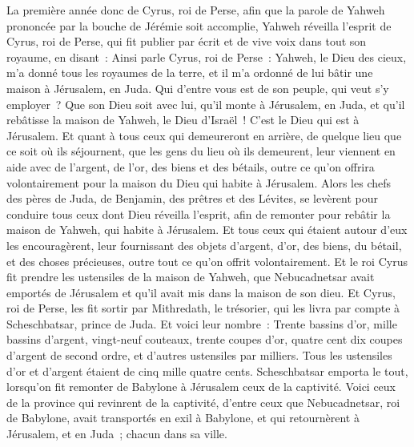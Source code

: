 \begin{multicols}{2}
\VerseOne{}La première année donc de Cyrus, roi de Perse, afin que la parole de Yahweh prononcée par la bouche de Jérémie soit accomplie, Yahweh réveilla l'esprit de Cyrus, roi de Perse, qui fit publier par écrit et de vive voix dans tout son royaume, en disant~:
Ainsi parle Cyrus, roi de Perse~: Yahweh, le Dieu des cieux, m'a donné tous les royaumes de la terre, et il m'a ordonné de lui bâtir une maison à Jérusalem, en Juda.
Qui d'entre vous est de son peuple, qui veut s'y employer~? Que son Dieu soit avec lui, qu'il monte à Jérusalem, en Juda, et qu'il rebâtisse la maison de Yahweh, le Dieu d'Israël~! C'est le Dieu qui est à Jérusalem.
Et quant à tous ceux qui demeureront en arrière, de quelque lieu que ce soit où ils séjournent, que les gens du lieu où ils demeurent, leur viennent en aide avec de l'argent, de l'or, des biens et des bétails, outre ce qu'on offrira volontairement pour la maison du Dieu qui habite à Jérusalem.
Alors les chefs des pères de Juda, de Benjamin, des prêtres et des Lévites, se levèrent pour conduire tous ceux dont Dieu réveilla l'esprit, afin de remonter pour rebâtir la maison de Yahweh, qui habite à Jérusalem.
Et tous ceux qui étaient autour d'eux les encouragèrent, leur fournissant des objets d'argent, d'or, des biens, du bétail, et des choses précieuses, outre tout ce qu'on offrit volontairement.
Et le roi Cyrus fit prendre les ustensiles de la maison de Yahweh, que Nebucadnetsar avait emportés de Jérusalem et qu'il avait mis dans la maison de son dieu.
Et Cyrus, roi de Perse, les fit sortir par Mithredath, le trésorier, qui les livra par compte à Scheschbatsar, prince de Juda.
Et voici leur nombre~: Trente bassins d'or, mille bassins d'argent, vingt-neuf couteaux,
trente coupes d'or, quatre cent dix coupes d'argent de second ordre, et d'autres ustensiles par milliers.
Tous les ustensiles d'or et d'argent étaient de cinq mille quatre cents. Scheschbatsar emporta le tout, lorsqu'on fit remonter de Babylone à Jérusalem ceux de la captivité.
\VerseOne{}Voici ceux de la province qui revinrent de la captivité, d'entre ceux que Nebucadnetsar, roi de Babylone, avait transportés en exil à Babylone, et qui retournèrent à Jérusalem, et en Juda~; chacun dans sa ville.

\end{multicols}
